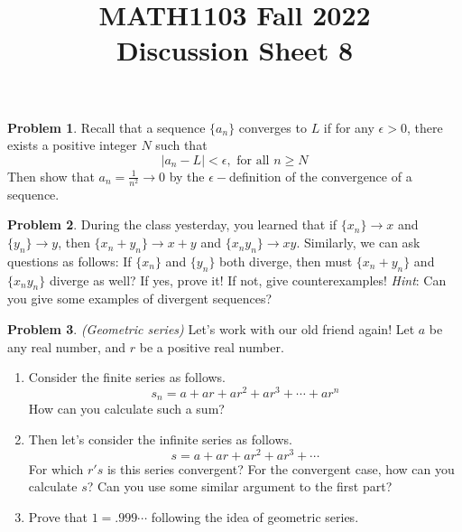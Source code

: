 \documentclass[11pt,oneside]{amsart}
\title{MATH1103 Fall 2022\\
Discussion Sheet 8}
\theoremstyle{definition}
\newtheorem{problem}{Problem}
\begin{document}
    \maketitle

    \begin{problem}
    Recall that a sequence $\{a_n\}$ converges to $L$ if for any $\epsilon >0$, there exists a positive integer $N$ such that 
    $$
    |a_n -L| <\epsilon, \text{ for all }n \geq N
    $$
    Then show that $a_n=\frac{1}{n^2} \to 0$ by the $\epsilon-$definition of the convergence of a sequence.
    \vfill
    \end{problem}
    
    \begin{problem}
    During the class yesterday, you learned that if $\{x_n\} \to x$ and $\{y_n\} \to y$, then $\{x_n+y_n\} \to x+y$ and $\{x_ny_n\} \to xy$. Similarly, we can ask questions as follows: If $\{x_n\}$ and $\{y_n\}$ both diverge, then must $\{x_n+y_n\}$ and $\{x_ny_n\}$ diverge as well? If yes, prove it! If not, give counterexamples! 
    \newline
    \textit{Hint}: Can you give some examples of divergent sequences? 
    \vfill
    \end{problem}
 
 \newpage   
    \begin{problem}\textit{(Geometric series)}
    Let's work with our old friend again! Let $a$ be any real number, and $r$ be a positive real number.
    \begin{enumerate}
        \item Consider the finite series as follows. 
        $$
        s_n=a+ar+ar^2+ar^3+\cdots+ar^n
        $$
        How can you calculate such a sum?
        \vfill
        \item Then let's consider the infinite series as follows.
        $$
        s=a+ar+ar^2+ar^3+\cdots
        $$
        For which $r's$ is this series convergent? For the convergent case, how can you calculate $s$? Can you use some similar argument to the first part?
        \vfill
        \item Prove that $1=.999\cdots$ following the idea of geometric series.
    \end{enumerate}
    \end{problem}

    
\end{document}
